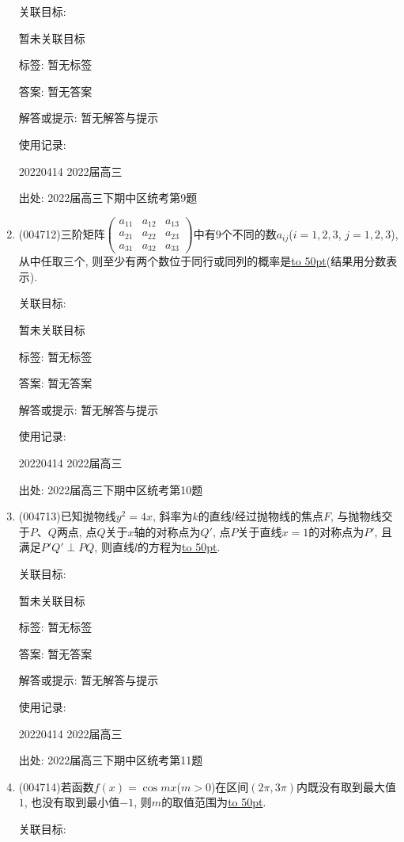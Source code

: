 \documentclass[10pt,a4paper]{article}
\newcommand{\blank}[1]{\underline{\hbox to #1pt{}}}
\begin{document}
\begin{enumerate}[1.]
关联目标:

暂未关联目标



标签: 暂无标签

答案: 暂无答案

解答或提示: 暂无解答与提示

使用记录:

20220414	2022届高三	


出处: 2022届高三下期中区统考第9题
\item { (004712)}三阶矩阵$\begin{pmatrix}
    a_{11} & a_{12} & a_{13} \\ a_{21} & a_{22} & a_{23} \\ a_{31} & a_{32} & a_{33}
\end{pmatrix}$中有$9$个不同的数$a_{ij}$($i=1,2,3$, $j=1,2,3$), 从中任取三个, 则至少有两个数位于同行或同列的概率是\blank{50}(结果用分数表示).


关联目标:

暂未关联目标



标签: 暂无标签

答案: 暂无答案

解答或提示: 暂无解答与提示

使用记录:

20220414	2022届高三	


出处: 2022届高三下期中区统考第10题
\item { (004713)}已知抛物线$y^2=4x$, 斜率为$k$的直线$l$经过抛物线的焦点$F$, 与抛物线交于$P$、$Q$两点, 点$Q$关于$x$轴的对称点为$Q'$, 点$P$关于直线$x=1$的对称点为$P'$, 且满足$P'Q'\perp PQ$, 则直线$l$的方程为\blank{50}.


关联目标:

暂未关联目标



标签: 暂无标签

答案: 暂无答案

解答或提示: 暂无解答与提示

使用记录:

20220414	2022届高三	


出处: 2022届高三下期中区统考第11题
\item { (004714)}若函数$f(x)=\cos mx$($m>0$)在区间$(2\pi,3\pi)$内既没有取到最大值$1$, 也没有取到最小值$-1$, 则$m$的取值范围为\blank{50}.


关联目标:


\end{enumerate}
\end{document}
